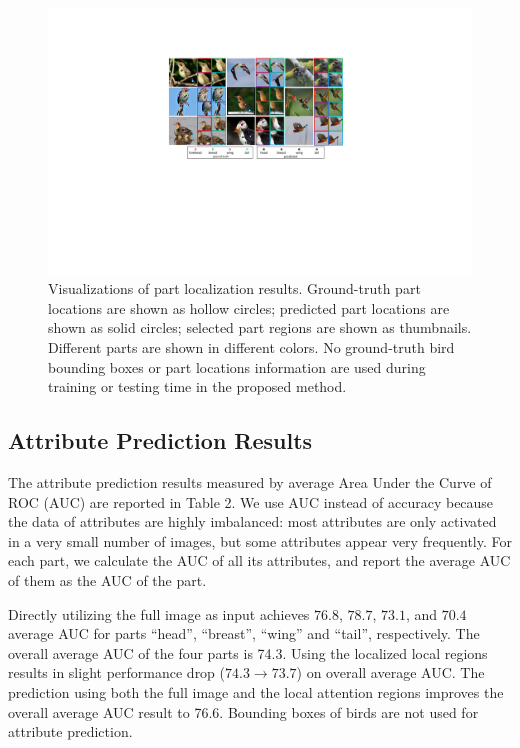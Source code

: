 \documentclass{article}
\begin{document}
\begin{figure}[!t]
\begin{center}
\includegraphics[scale = 0.45]{2.pdf}
\end{center}
\caption{Visualizations of part localization results. Ground-truth part locations are shown as hollow circles; predicted part locations are shown as solid circles; selected part regions are shown as thumbnails.
Different parts are shown in different colors. No ground-truth bird bounding boxes or part locations information are used during training or testing time in the proposed method.
}\label{fig:fig3}
\end{figure}

\subsection{Attribute Prediction Results}
The attribute prediction results measured by average Area Under the Curve of ROC (AUC) are reported in Table 2.
We use AUC instead of accuracy because the data of attributes are highly imbalanced:
most attributes are only activated in a very small number of images, but some attributes appear very frequently. For each part, we calculate the AUC of all its attributes, and report the average AUC of them as the AUC of the part.

Directly utilizing the full image as input achieves $76.8$, $78.7$, $73.1$, and $70.4$ average AUC for parts ``head'', ``breast'', ``wing'' and ``tail'', respectively.
The overall average AUC of the four parts is 74.3.
Using the localized local regions results in slight performance drop ($74.3\to 73.7$) on overall average AUC.
The prediction using both the full image and the local attention regions improves the overall average AUC result to 76.6.
Bounding boxes of birds are not used for attribute prediction.
\end{document}
